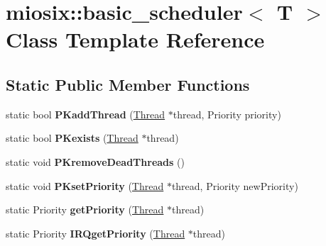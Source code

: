 \hypertarget{classmiosix_1_1basic__scheduler}{\section{miosix\-:\-:basic\-\_\-scheduler$<$ T $>$ Class Template Reference}
\label{classmiosix_1_1basic__scheduler}
}
\subsection*{Static Public Member Functions}
\begin{DoxyCompactItemize}
\item 
\hypertarget{classmiosix_1_1basic__scheduler_accc91ba2a9c6e701c381b7746a2d522c}{static bool {\bfseries P\-Kadd\-Thread} (\hyperlink{classmiosix_1_1_thread}{Thread} $\ast$thread, Priority priority)}\label{classmiosix_1_1basic__scheduler_accc91ba2a9c6e701c381b7746a2d522c}

\item 
\hypertarget{classmiosix_1_1basic__scheduler_a819761600a545d7e424707a0436e7885}{static bool {\bfseries P\-Kexists} (\hyperlink{classmiosix_1_1_thread}{Thread} $\ast$thread)}\label{classmiosix_1_1basic__scheduler_a819761600a545d7e424707a0436e7885}

\item 
\hypertarget{classmiosix_1_1basic__scheduler_a8ef3de8dd43cee776042b83468f93fe0}{static void {\bfseries P\-Kremove\-Dead\-Threads} ()}\label{classmiosix_1_1basic__scheduler_a8ef3de8dd43cee776042b83468f93fe0}

\item 
\hypertarget{classmiosix_1_1basic__scheduler_a7733130a1db166617b55b69cf2c03538}{static void {\bfseries P\-Kset\-Priority} (\hyperlink{classmiosix_1_1_thread}{Thread} $\ast$thread, Priority new\-Priority)}\label{classmiosix_1_1basic__scheduler_a7733130a1db166617b55b69cf2c03538}

\item 
\hypertarget{classmiosix_1_1basic__scheduler_aec49b165e4695fc6fe474c0b534bd083}{static Priority {\bfseries get\-Priority} (\hyperlink{classmiosix_1_1_thread}{Thread} $\ast$thread)}\label{classmiosix_1_1basic__scheduler_aec49b165e4695fc6fe474c0b534bd083}

\item 
\hypertarget{classmiosix_1_1basic__scheduler_a4c3ef9bdb9ece0cb95a209143b1d42fc}{static Priority {\bfseries I\-R\-Qget\-Priority} (\hyperlink{classmiosix_1_1_thread}{Thread} $\ast$thread)}\label{classmiosix_1_1basic__scheduler_a4c3ef9bdb9ece0cb95a209143b1d42fc}


\end{DoxyCompactItemize}
